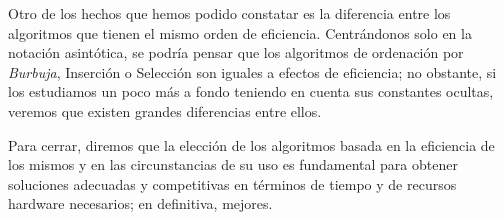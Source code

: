 \documentclass[11pt,a4paper]{article}
\begin{document}
		\par
		Otro de los hechos que hemos podido constatar es la diferencia entre los algoritmos que tienen el mismo orden de eficiencia. Centrándonos solo en la notación asintótica, se podría pensar que los algoritmos de ordenación por \textit{Burbuja}, Inserción o Selección son iguales a efectos de eficiencia; no obstante, si los estudiamos un poco más a fondo teniendo en cuenta sus constantes ocultas, veremos que existen grandes diferencias entre ellos. \\

		\par
		Para cerrar, diremos que la elección de los algoritmos basada en la eficiencia de los mismos y en las circunstancias de su uso es fundamental para obtener soluciones adecuadas y competitivas en términos de tiempo y de recursos hardware necesarios; en definitiva, mejores.
\end{document}
